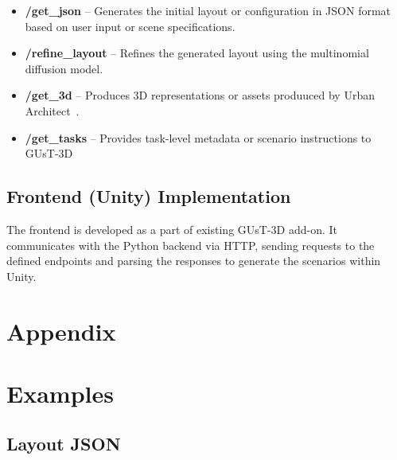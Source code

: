\documentclass{article}
\begin{document}
\begin{itemize}
    \item \textbf{/get\_json} – Generates the initial layout or configuration in JSON format based on user input or scene specifications.
    \item \textbf{/refine\_layout} – Refines the generated layout using the multinomial diffusion model.
    \item \textbf{/get\_3d} – Produces 3D representations or assets produuced by Urban Architect~\cite{lu2024urban}.
    \item \textbf{/get\_tasks} – Provides task-level metadata or scenario instructions to GUsT-3D
\end{itemize}

\subsection{Frontend (Unity) Implementation}

The frontend is developed as a part of existing GUsT-3D add-on. It communicates with the Python backend via HTTP, sending requests to the defined endpoints and parsing the responses to generate the scenarios within Unity. 

\section*{Appendix}

\section{Examples}

\subsection{Layout JSON}
\label{app:examples:example_json}
\end{document}
